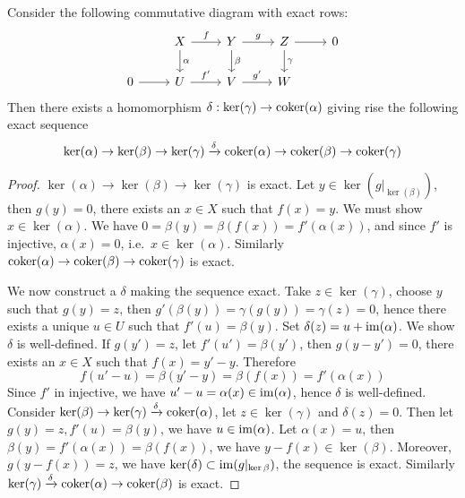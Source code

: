 \begin{lem}
    Consider the following commutative diagram with exact rows:
    \[\begin{tikzcd}
        {} & X \ar[r, "f"] \ar[d,"\alpha"] & Y \ar[r, "g"] \ar[d,"\beta"] & Z \ar[r] \ar[d,"\gamma"] & 0 \\
        0 \ar[r] & U \ar[r, "f'"] & V \ar[r, "g'"] & W & {}
    \end{tikzcd}\]
    Then there exists a homomorphism $\delta:\ker(\gamma)\to\operatorname{coker}(\alpha)$ giving rise the following exact sequence
    \[\ker(\alpha)\to\ker(\beta)\to\ker(\gamma)\xrightarrow{\delta}\operatorname{coker}(\alpha)\to\operatorname{coker}(\beta)\to\operatorname{coker}(\gamma)\]
\end{lem}
\begin{proof}
    $\ker(\alpha)\to\ker(\beta)\to\ker(\gamma)$ is exact.
    Let $y\in\ker(g|_{\ker(\beta)})$, then $g(y)=0$, there exists an $x\in X$ such that $f(x)=y$.
    We must show $x\in\ker(\alpha)$.
    We have $0=\beta(y)=\beta(f(x))=f'(\alpha(x))$, and since $f'$ is injective, $\alpha(x)=0$, i.e.\ $x\in\ker(\alpha)$.
    Similarly $\operatorname{coker}(\alpha)\to\operatorname{coker}(\beta)\to\operatorname{coker}(\gamma)$ is exact.

    We now construct a $\delta$ making the sequence exact.
    Take $z\in\ker(\gamma)$, choose $y$ such that $g(y)=z$, then $g'(\beta(y))=\gamma(g(y))=\gamma(z)=0$, hence there exists a unique $u\in U$ such that $f'(u)=\beta(y)$.
    Set $\delta(z)=u+\operatorname{im}(\alpha)$.
    We show $\delta$ is well-defined.
    If $g(y')=z$, let $f'(u')=\beta(y')$, then $g(y-y')=0$, there exists an $x\in X$ such that $f(x)=y'-y$.
    Therefore
    \[f(u'-u)=\beta(y'-y)=\beta(f(x))=f'(\alpha(x))\]
    Since $f'$ in injective, we have $u'-u=\alpha(x)\in\operatorname{im}(\alpha)$, hence $\delta$ is well-defined.
    Consider $\ker(\beta)\to\ker(\gamma)\xrightarrow{\delta}\operatorname{coker}(\alpha)$, let $z\in\ker(\gamma)$ and $\delta(z)=0$.
    Then let $g(y)=z,f'(u)=\beta(y)$, we have $u\in\operatorname{im}(\alpha)$.
    Let $\alpha(x)=u$, then $\beta(y)=f'(\alpha(x))=\beta(f(x))$, we have $y-f(x)\in\ker(\beta)$.
    Moreover, $g(y-f(x))=z$, we have $\ker(\delta)\subset\operatorname{im}(g|_{\ker\beta})$, the sequence is exact.
    Similarly $\ker(\gamma)\xrightarrow{\delta}\operatorname{coker}(\alpha)\to\operatorname{coker}(\beta)$ is exact.
\end{proof}

